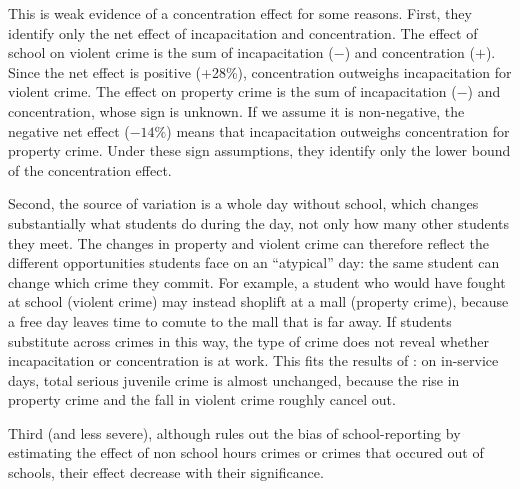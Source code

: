 This is weak evidence of a concentration effect for some reasons.
First, they identify only the net effect of incapacitation and concentration.
The effect of school on violent crime is the sum of incapacitation ($-$) and
concentration ($+$). Since the net effect is positive (+28\%), concentration
outweighs incapacitation for violent crime. The effect on property crime is the
sum of incapacitation ($-$) and concentration, whose sign is unknown. If we
assume it is non-negative, the negative net effect ($-14\%$) means that
incapacitation outweighs concentration for property crime. Under these sign
assumptions, they identify only the lower bound of the concentration effect. 


Second, the source of variation is a whole day without school, which changes
substantially what students do during the day, not only how many other students
they meet. The changes in property and violent crime can therefore reflect the
different opportunities students face on an ``atypical'' day: the same student
can change which crime they commit. For example, a student who would have
fought at school (violent crime) may instead shoplift at a mall (property
crime), because a free day leaves time to comute to the mall that is far away.
 If students substitute across crimes in this way, the type of
crime does not reveal whether incapacitation or concentration is at work. This
fits the results of \citet{jacob2003}: on in-service days, total serious
juvenile crime is almost unchanged, because the rise in property crime and the
fall in violent crime roughly cancel out.

Third (and less severe), although \citet{jacob2003} rules out the bias of school-reporting by 
estimating the effect of non school hours crimes or crimes that occured out of schools, their effect decrease with their significance. 

